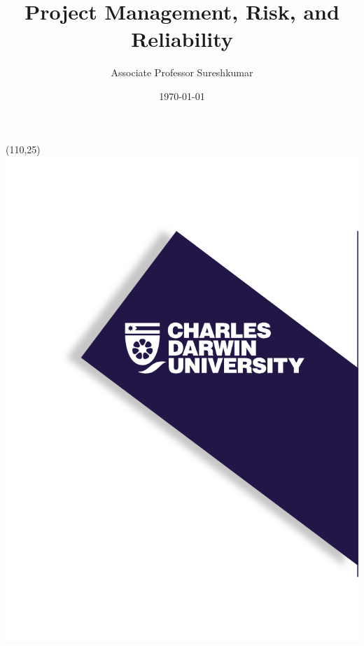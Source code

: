 \documentclass[aspectratio=169]{beamer}
\title[PRT551 - Lecture 1]{Project Management, Risk, and Reliability} %
\author{Associate Professor Sureshkumar} %
\institute[CDU] %
{
Charles Darwin University \\ %
\medskip
\textit{cdux@cdu.edu.au} %
}
\date{\today} %
\begin{document}
\begin{frame}
\titlepage %
\begin{textblock}{20}(110,25)
      \includegraphics[scale=0.8]{logo_1.png}
\end{textblock}
\end{frame}

\end{document}
